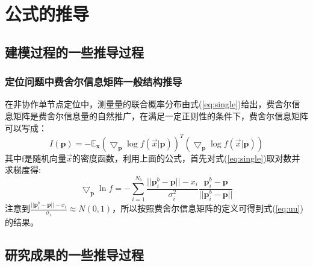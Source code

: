 %
\chapter{公式的推导}
\section{建模过程的一些推导过程}
\subsection{定位问题中费舍尔信息矩阵一般结构推导}\label{A_F_1}
在非协作单节点定位中，测量量的联合概率分布由式(\ref{eq:single})给出，费舍尔信息矩阵是费舍尔信息量的自然推广，在满足一定正则性的条件下，费舍尔信息矩阵可以写成：
\begin{equation}
I(\bm{p})=-\mathbb{E}_{\bm{x}}(\bigtriangledown_{\bm{p}} \log f(\vec{x}|\bm{p}))^T(\bigtriangledown_{\bm{p}} \log f(\vec{x}|\bm{p}))
\end{equation}
其中f是随机向量$\vec{x}$的密度函数，利用上面的公式，首先对式(\ref{eq:single})取对数并求梯度得:
\begin{equation}
\bigtriangledown_{\bm{p}}\ln f=-\sum_{i=1}^{N_b}\frac{||\bm{p}_i^b-\bm{p}||-x_i}{\sigma_i^2}\frac{\bm{p}^b_i-\bm{p}}{||\bm{p}^b_i-\bm{p}||}
\end{equation}
注意到$\frac{||\bm{p}_i^b-\bm{p}||-x_i}{\sigma_i}\approx N(0,1)$，所以按照费舍尔信息矩阵的定义可得到式(\ref{eq:uu})的结果。
\section{研究成果的一些推导过程}
